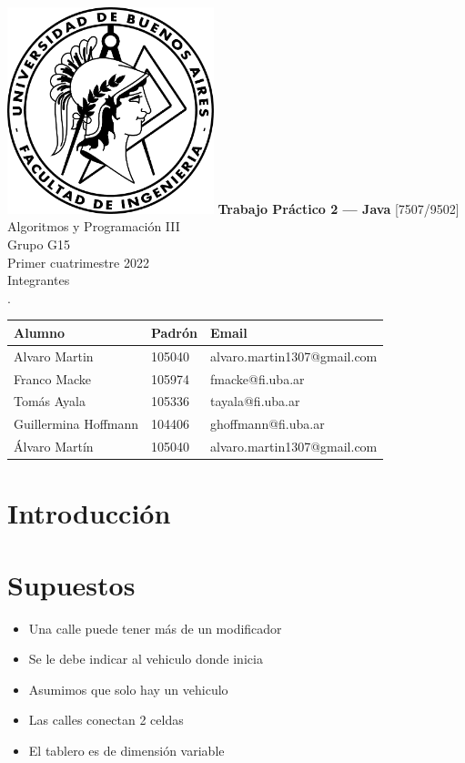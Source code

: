 \documentclass[titlepage,a4paper]{article}
\begin{document}
\begin{titlepage} %
	\hfill\includegraphics[width=6cm]{logofiuba.jpg}
    \centering
    \vfill
    \Huge \textbf{Trabajo Práctico 2 — Java}
    \vskip2cm
    \Large [7507/9502] Algoritmos y Programación III\\
    Grupo G15 \\
    Primer cuatrimestre 2022 \\
    \vfill
    Integrantes \\
    .\\
    \begin{tabular}{ | l | l | l | } %
      \hline
      Alumno & Padrón & Email \\ \hline
      Alvaro Martin & 105040 & alvaro.martin1307@gmail.com \\ \hline
      Franco Macke & 105974 & fmacke@fi.uba.ar \\ \hline
      Tomás Ayala & 105336 & tayala@fi.uba.ar \\ \hline
      Guillermina Hoffmann & 104406 & ghoffmann@fi.uba.ar \\ \hline
      Álvaro Martín & 105040 & alvaro.martin1307@gmail.com \\ \hline
  	\end{tabular}
    \vfill
    \vfill
\end{titlepage}

\tableofcontents %
\newpage

\section{Introducción}\label{sec:intro}

\section{Supuestos}\label{sec:supuestos}
  \begin{itemize}
    \item Una calle puede tener más de un modificador
    \item Se le debe indicar al vehiculo donde inicia
    \item Asumimos que solo hay un vehiculo
    \item Las calles conectan 2 celdas
    \item El tablero es de dimensión variable
  \end{itemize}
\end{document}
